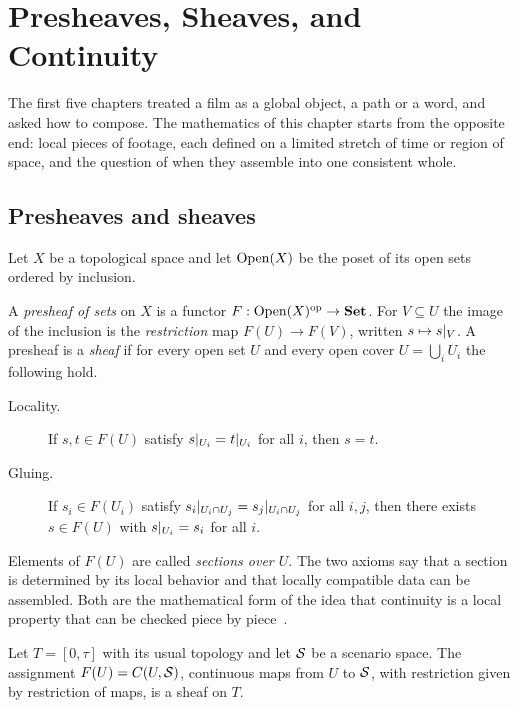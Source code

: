 \chapter{Presheaves, Sheaves, and Continuity}
\label{ch:sheaves}

The first five chapters treated a film as a global object, a path or a word, and asked how to compose. The mathematics of this chapter starts from the opposite end: local pieces of footage, each defined on a limited stretch of time or region of space, and the question of when they assemble into one consistent whole.

\section{Presheaves and sheaves}

Let $X$ be a topological space and let $\mathrm{Open}(X)$ be the poset of its open sets ordered by inclusion.

\begin{definition}
A \emph{presheaf of sets} on $X$ is a functor $F:\mathrm{Open}(X)^{\mathrm{op}}\to\mathbf{Set}$. For $V\subseteq U$ the image of the inclusion is the \emph{restriction} map $F(U)\to F(V)$, written $s\mapsto s|_{V}$. A presheaf is a \emph{sheaf} if for every open set $U$ and every open cover $U=\bigcup_iU_i$ the following hold.
\begin{description}
\item[Locality.] If $s,t\in F(U)$ satisfy $s|_{U_i}=t|_{U_i}$ for all $i$, then $s=t$.
\item[Gluing.] If $s_i\in F(U_i)$ satisfy $s_i|_{U_i\cap U_j}=s_j|_{U_i\cap U_j}$ for all $i,j$, then there exists $s\in F(U)$ with $s|_{U_i}=s_i$ for all $i$.
\end{description}
\end{definition}

Elements of $F(U)$ are called \emph{sections over $U$}. The two axioms say that a section is determined by its local behavior and that locally compatible data can be assembled. Both are the mathematical form of the idea that continuity is a local property that can be checked piece by piece~\cite{maclane1992}.

\begin{proposition}\label{prop:takes}
Let $T=[0,\tau]$ with its usual topology and let $\mathcal{S}$ be a scenario space. The assignment $F(U)=C(U,\mathcal{S})$, continuous maps from $U$ to $\mathcal{S}$, with restriction given by restriction of maps, is a sheaf on $T$.
\end{proposition}

